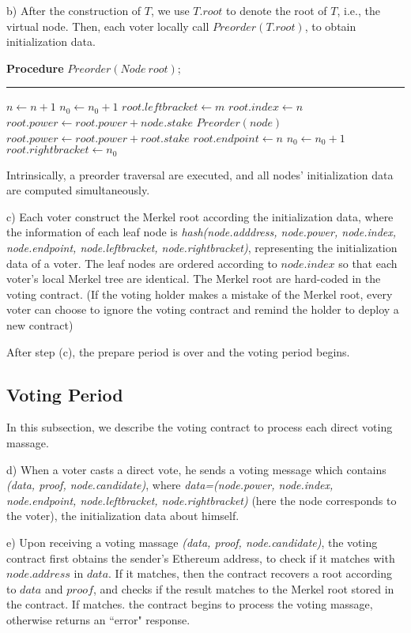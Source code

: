 b) After the construction of $T$, we use $T.root$ to denote the root of $T$, i.e., the virtual node. Then, each voter locally call $Preorder(T.root)$, to obtain initialization data.

\begin{algorithm}
	\label{alg:preorder}
	\textbf{Procedure} $Preorder(Node~root)$;
	\hrule
	$n \leftarrow n+1$\;
	$n_0 \leftarrow n_0+1$\;
	$root.leftbracket \leftarrow m$\;
	$root.index \leftarrow n$\;
	{
		$root.power \leftarrow root.power+node.stake$\;
		$Preorder(node)$
	}
    $root.power \leftarrow root.power+root.stake$\;
	$root.endpoint \leftarrow n$\;
	$n_0 \leftarrow n_0+1$\;
	$root.rightbracket \leftarrow n_0$\;
\end{algorithm}
Intrinsically, a preorder traversal are executed, and all nodes' initialization data are computed simultaneously. 

c) Each voter construct the Merkel root according the initialization data, where the information of each leaf node is {\em hash(node.adddress, node.power, node.index, node.endpoint, node.leftbracket, node.rightbracket)}, representing the initialization data of a voter. The leaf nodes are ordered according to $node.index$ so that each voter's local Merkel tree are identical. The  Merkel root are hard-coded in the voting contract. (If the voting holder makes a mistake of the Merkel root, every voter can choose to ignore the voting contract and remind the holder to deploy a new contract)

After step (c), the prepare period is over and the voting period begins.
\subsection{Voting Period}
In this subsection, we describe the voting contract to process each direct voting massage. 

d) When a voter casts a direct vote, he sends a voting message which contains {\em(data, proof, node.candidate)}, where {\em data=(node.power, node.index, node.endpoint, node.leftbracket, node.rightbracket)} (here the node corresponds to the voter), the initialization data about himself. 

e) Upon receiving a voting massage {\em(data, proof, node.candidate)}, the voting contract first obtains the sender's Ethereum address, to check if it matches with	 $node.address$ in $data$.   If it matches, then the contract recovers a root according to $data$ and $proof$, and checks if the result matches to the Merkel root stored in the contract. If matches. the contract begins to process the voting massage, otherwise returns an ``error" response.

